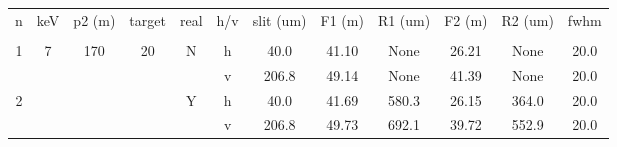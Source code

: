 \documentclass[]{article}
\begin{document}
  

\thispagestyle{empty}




\begin{table}[]
\begin{tabular}{|c|c|c|c|c|c|c|c|c|c|c|c|}
\multicolumn{1}{l}{n} & keV & p2 (m) & target & real & h/v & slit (um) & F1 (m) & R1 (um) & F2 (m) & R2 (um) & fwhm \\
                           &                     &                       &                      &                                         &           &                     &                  &                  &                  &                  &                 \\
\hline
\multirow{2}{*}{1}         & \multirow{20}{*}{7} & \multirow{12}{*}{170} & \multirow{4}{*}{20}  & \multirow{2}{*}{N}                      & h         & 40.0                & 41.10            & None             & 26.21            & None             & 20.0            \\
                           &                     &                       &                      &                                         & v         & 206.8               & 49.14            & None             & 41.39            & None             & 20.0            \\
\multirow{2}{*}{2}         &                     &                       &                      & \multirow{2}{*}{Y}                      & h         & 40.0                & 41.69            & 580.3            & 26.15            & 364.0            & 20.0            \\
                           &                     &                       &                      &                                         & v         & 206.8               & 49.73            & 692.1            & 39.72            & 552.9            & 20.0            \\

\end{tabular}
\end{table}
\end{document}
